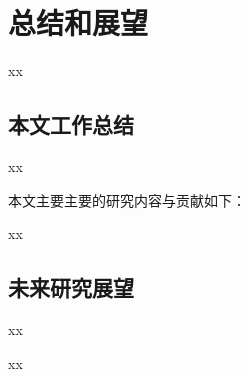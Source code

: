 \chapter{总结和展望}
xx

\section{本文工作总结}
xx


本文主要主要的研究内容与贡献如下：
%
\begin{asparaenum}
\item xx

\end{asparaenum}


\section{未来研究展望}
%
xx
\begin{asparaenum}
\item xx

\end{asparaenum}
